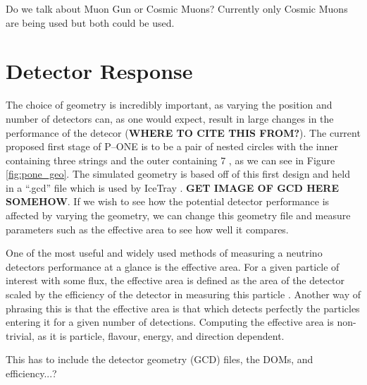 Do we talk about Muon Gun or Cosmic Muons? Currently only Cosmic Muons are being used but both could be used.

\section{Detector Response}

The choice of geometry is incredibly important, as varying the position and number of detectors can, as one would expect, result in large changes in the performance of the detecor (\textbf{WHERE TO CITE THIS FROM?}). The current proposed first stage of P--ONE is to be a pair of nested circles with the inner containing three strings and the outer containing 7 \cite{pone}, as we can see in Figure \ref{fig:pone_geo}. The simulated geometry is based off of this first design and held in a ``.gcd'' file which is used by IceTray \cite{icetray}. \textbf{GET IMAGE OF GCD HERE SOMEHOW}. If we wish to see how the potential detector performance is affected by varying the geometry, we can change this geometry file and measure parameters such as the effective area to see how well it compares.

One of the most useful and widely used methods of measuring a neutrino detectors performance at a glance is the effective area. For a given particle of interest with some flux, the effective area is defined as the area of the detector scaled by the efficiency of the detector in measuring this particle \cite{2010icecube}. Another way of phrasing this is that the effective area is that which detects perfectly the particles entering it for a given number of detections. Computing the effective area is non-trivial, as it is particle, flavour, energy, and direction dependent. 

This has to include the detector geometry (GCD) files, the DOMs, and efficiency...?

